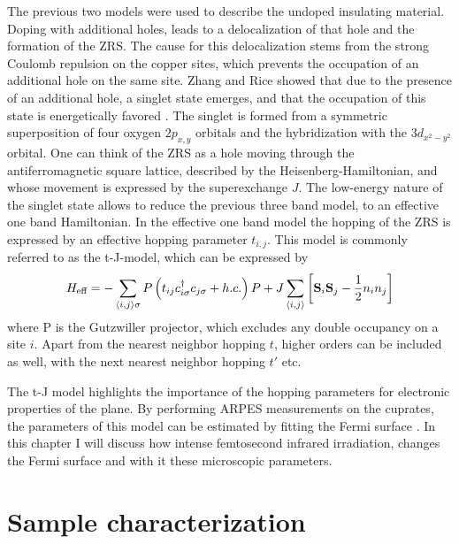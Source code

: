 The previous two models were used to describe the undoped insulating material.
Doping with additional holes, leads to a delocalization of that hole and the formation of the ZRS.
The cause for this delocalization stems from the strong Coulomb repulsion on the copper sites, which prevents the occupation of an additional hole on the same site.
Zhang and Rice showed that due to the presence of an additional hole, a singlet state emerges, and that the occupation of this state is energetically favored \cite{zhang_effective_1988}.
The singlet is formed from a symmetric superposition of four oxygen $2p_{x,y}$ orbitals and the hybridization with the  $3d_{x^2-y^2}$ orbital.
One can think of the ZRS as a hole moving through the antiferromagnetic square lattice, described by the Heisenberg-Hamiltonian, and whose movement is expressed by the superexchange $J$.
The low-energy nature of the singlet state allows to reduce the previous three band model, to an effective one band Hamiltonian.
In the effective one band model the hopping of the ZRS is expressed by an effective hopping parameter $t_{i,j}$.
This model is commonly referred to as the t-J-model, which can be expressed by
\begin{equation}
	H_\text{eff} = - \sum_{\braket{i,j}\sigma} P \left( t_{ij} c_{i\sigma}^\dagger c_{j\sigma} + h.c. \right) P + J \sum_{\braket{i,j}} \left[\mathbf{S}_i \mathbf{S}_j - \frac{1}{2} n_i n_j\right]
\end{equation}
where P is the Gutzwiller projector, which excludes any double occupancy on a site $i$.
Apart from the nearest neighbor hopping $t$, higher orders can be included as well, with the next nearest neighbor hopping $t'$ etc.

The t-J model highlights the importance of the hopping parameters for electronic properties of the  plane.
By performing ARPES measurements on the cuprates, the parameters of this model can be estimated by fitting the Fermi surface \cite{norman_phenomenological_1995}.
In this chapter I will discuss how intense femtosecond infrared irradiation, changes the Fermi surface and with it these microscopic parameters.

\section{Sample characterization}

